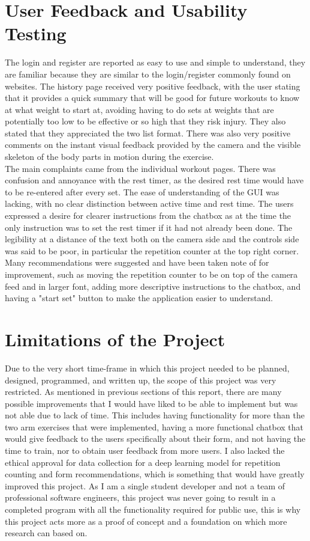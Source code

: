 \section{User Feedback and Usability Testing \label{sec:feedback}}
    The login and register are reported as easy to use and simple to understand, they are familiar because they are similar to the login/register commonly found on websites. The history page received very positive feedback, with the user stating that it provides a quick summary that will be good for future workouts to know at what weight to start at, avoiding having to do sets at weights that are potentially too low to be effective or so high that they risk injury. They also stated that they appreciated the two list format. There was also very positive comments on the instant visual feedback provided by the camera and the visible skeleton of the body parts in motion during the exercise.\\
    The main complaints came from the individual workout pages. There was confusion and annoyance with the rest timer, as the desired rest time would have to be re-entered after every set. The ease of understanding of the GUI was lacking, with no clear distinction between active time and rest time. The users expressed a desire for clearer instructions from the chatbox as at the time the only instruction was to set the rest timer if it had not already been done. The legibility at a distance of the text both on the camera side and the controls side was said to be poor, in particular  the repetition counter at the top right corner.\\
    Many recommendations were suggested and have been taken note of for improvement, such as moving the repetition counter to be on top of the camera feed and in larger font, adding more descriptive instructions to the chatbox, and having a "start set" button to make the application easier to understand.
\section{Limitations of the Project}
    Due to the very short time-frame in which this project needed to be planned, designed, programmed, and written up, the scope of this project was very restricted. As mentioned in previous sections of this report, there are many possible improvements that I would have liked to be able to implement but was not able due to lack of time. This includes having functionality for more than the two arm exercises that were implemented, having a more functional chatbox that would give feedback to the users specifically about their form, and not having the time to train, nor to obtain user feedback from more users. I also lacked the ethical approval for data collection for a deep learning model for repetition counting and form recommendations, which is something that would have greatly improved this project. As I am a single student developer and not a team of professional software engineers, this project was never going to result in a completed program with all the functionality required for public use, this is why this project acts more as a proof of concept and a foundation on which more research can based on. 